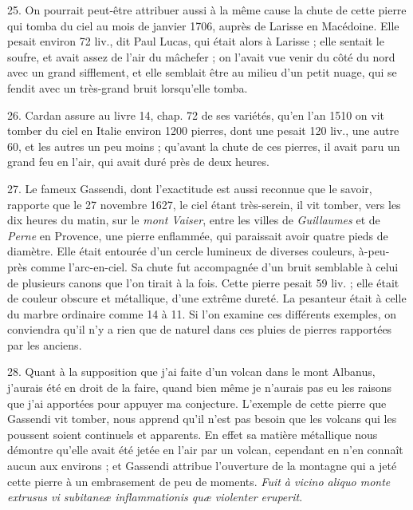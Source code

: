 \documentclass[a4paper, 11pt, oneside, polutonikogreek, french]{article}
\begin{document}
25. On pourrait peut-être attribuer aussi à la même cause la chute de cette pierre qui tomba du ciel au mois de janvier 1706, auprès de Larisse en Macédoine. Elle pesait environ 72 liv., dit Paul Lucas, qui était alors à Larisse ; elle sentait le soufre, et avait assez de l'air du mâchefer ; on l'avait vue venir du côté du nord avec un grand sifflement, et elle semblait être au milieu d'un petit nuage, qui se fendit avec un très-grand bruit lorsqu'elle tomba.

26. Cardan assure au livre 14, chap. 72 de ses variétés, qu'en l'an 1510 on vit tomber du ciel en Italie environ 1200 pierres, dont une pesait 120 liv., une autre 60, et les autres un peu moins ; qu'avant la chute de ces pierres, il avait paru un grand feu en l'air, qui avait duré près de deux heures.

27. Le fameux Gassendi, dont l'exactitude est aussi reconnue que le savoir, rapporte que le 27 novembre 1627, le ciel étant très-serein, il vit tomber, vers les dix heures du matin, sur le \emph{mont Vaiser}, entre les villes de \emph{Guillaumes} et de \emph{Perne} en Provence, une pierre enflammée, qui paraissait avoir quatre pieds de diamètre. Elle était entourée d'un cercle lumineux de diverses couleurs, à-peu-près comme l'arc-en-ciel. Sa chute fut accompagnée d'un bruit semblable à celui de plusieurs canons que l'on tirait à la fois. Cette pierre pesait 59 liv. ; elle était de couleur obscure et métallique, d'une extrême dureté. La pesanteur était à celle du marbre ordinaire comme 14 à 11. Si l'on examine ces différents exemples, on conviendra qu'il n'y a rien que de naturel dans ces pluies de pierres rapportées par les anciens.

28. Quant à la supposition que j'ai faite d'un volcan dans le mont Albanus, j'aurais été en droit de la faire, quand bien même je n'aurais pas eu les raisons que j'ai apportées pour appuyer ma conjecture. L'exemple de cette pierre que Gassendi vit tomber, nous apprend qu'il n'est pas besoin que les volcans qui les poussent soient continuels et apparents. En effet sa matière métallique nous démontre qu'elle avait été jetée en l'air par un volcan, cependant en n'en connaît aucun aux environs ; et Gassendi attribue l'ouverture de la montagne qui a jeté cette pierre à un embrasement de peu de moments. \emph{Fuit à vicino aliquo monte extrusus vi subitaneæ inflammationis quæ violenter eruperit}.
\end{document}
